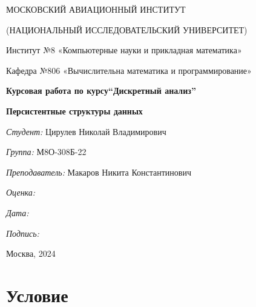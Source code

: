 \documentclass[12pt]{article}
\begin{document}
\thispagestyle{empty}	
\begin{center}
	МОСКОВСКИЙ АВИАЦИОННЫЙ ИНСТИТУТ
	
	(НАЦИОНАЛЬНЫЙ ИССЛЕДОВАТЕЛЬСКИЙ УНИВЕРСИТЕТ)
\vspace{3ex}

	Институт №8 «Компьютерные науки и прикладная математика»
    
	Кафедра №806 «Вычислительна математика и программирование»
	
\end{center}
\vspace{25ex}
\begin{center}
	\textbf{\large{Курсовая работа по курсу\linebreak \textquotedblleft Дискретный анализ\textquotedblright}}
\end{center}
\vspace{3ex}
\begin{center}
    \textbf{\large{Персистентные структуры данных}}
\end{center}
\vspace{20ex}
\begin{flushright}
	\textit{Студент: } Цирулев Николай Владимирович
	
	\vspace{2ex}
	\textit{Группа: } М8О-308Б-22
	
	\vspace{2ex}
	\textit{Преподаватель: } Макаров Никита Константинович 
	
	\vspace{2ex}
	\textit{Оценка: } \underline{\quad\quad\quad\quad\quad\quad}
	
	 \vspace{2ex}
	\textit{Дата: } \underline{\quad\quad\quad\quad\quad\quad}
	
	\vspace{2ex}
	\textit{Подпись: } \underline{\quad\quad\quad\quad\quad\quad}
	
\end{flushright}
\vspace{5ex}

\begin{vfill}
	\begin{center}
		Москва, 2024
	\end{center}	
\end{vfill}
\newpage



\section*{Условие}  \\
\end{document}
